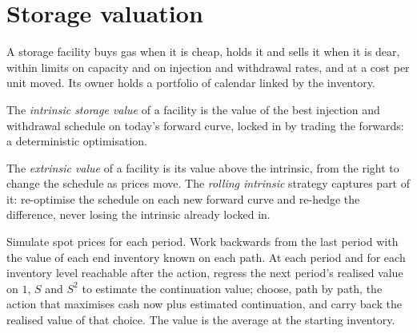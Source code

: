 \section{Storage valuation}

A storage facility buys gas when it is cheap, holds it and sells it when it is dear,
within limits on capacity and on injection and withdrawal rates, and at a cost per unit
moved. Its owner holds a portfolio of calendar  linked by the inventory.

\begin{definition}\label{def:rc:commodity-and-energy-derivatives:intrinsic}
The \emph{intrinsic storage value} of a facility is the
value of the best injection and withdrawal schedule on today's forward curve, locked in
by trading the forwards: a deterministic optimisation.
\end{definition}

\begin{definition}\label{def:rc:commodity-and-energy-derivatives:extrinsic}
The \emph{extrinsic value} of a facility is its value above the
intrinsic, from the right to change the schedule as prices move. The \emph{rolling
intrinsic} strategy captures part of it: re-optimise the schedule on
each new forward curve and re-hedge the difference, never losing the intrinsic already
locked in.
\end{definition}

\begin{method}\label{met:rc:commodity-and-energy-derivatives:lsm}
Simulate spot prices for each period. Work backwards from the last period with the value
of each end inventory known on each path. At each period and for each inventory level
reachable after the action, regress the next period's realised value on $1$, $S$ and $S^2$
to estimate the continuation value; choose, path by path, the action that maximises cash
now plus estimated continuation, and carry back the realised value of that choice. The
value is the average at the starting inventory.
\end{method}

\label{lst:rc:commodity-and-energy-derivatives:lsm}


